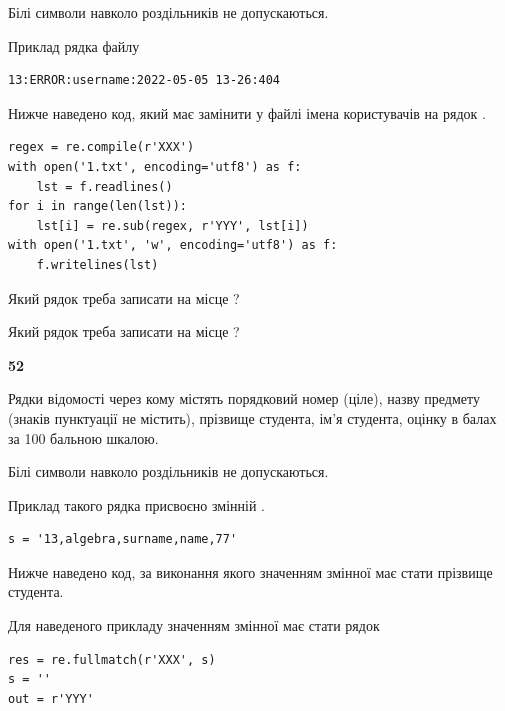 Білі символи навколо роздільників не допускаються.

Приклад рядка файлу



\begin{verbatim}
13:ERROR:username:2022-05-05 13-26:404
\end{verbatim}


Нижче наведено код, який має замінити у файлі імена користувачів на рядок .



\begin{verbatim}
regex = re.compile(r'XXX')
with open('1.txt', encoding='utf8') as f:
    lst = f.readlines()
for i in range(len(lst)):
    lst[i] = re.sub(regex, r'YYY', lst[i])
with open('1.txt', 'w', encoding='utf8') as f:
    f.writelines(lst)
\end{verbatim}







Який рядок треба записати на місце  ?\par
\vspace{5mm}


Який рядок треба записати на місце  ?\par


\newpage

{\begin {center}\textbf{ 52}\end {center}}\par
Рядки відомості через кому містять порядковий номер (ціле), назву предмету (зна\-ків пунктуації не містить), прізвище студента, ім'я студента, оцінку в балах за 100 бальною шкалою.

Білі символи навколо роздільників не допускаються.

Приклад такого рядка присвоєно змінній .



\begin{verbatim}
s = '13,algebra,surname,name,77'
\end{verbatim}


Нижче наведено код, за виконання якого значенням змінної  має стати прізвище студента.

Для наведеного прикладу значенням змінної  має стати рядок 



\begin{verbatim}
res = re.fullmatch(r'XXX', s)
s = ''
out = r'YYY'
\end{verbatim}


